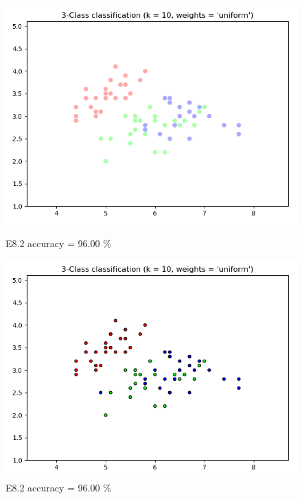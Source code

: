 \documentclass{classrep}
\begin{document}
\begin{figure}[H]
			\begin{minipage}{0.5\linewidth}
				\centering
				\includegraphics[scale=0.25]{KNN_iris_8_3.png}
				\caption{E8.2 accuracy = 96.00 \%}
				\label{E8.2}
			\end{minipage}
			\begin{minipage}{0.5\linewidth}
				\centering
				\includegraphics[scale=0.25]{KNN_iris_8_4.png}
				\caption{E8.2 accuracy = 96.00 \%}
				\label{E8.2}
			\end{minipage}
			\begin{minipage}{0.5\linewidth}
				\centering

\end{minipage}
\end{figure}
\end{document}
